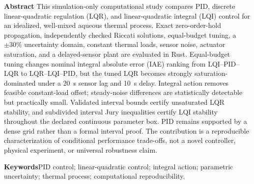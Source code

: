 \small\noindent\textbf{Abstract}\quad
This simulation-only computational study compares PID, discrete linear-quadratic regulation (LQR), and linear-quadratic integral (LQI) control for an idealized, well-mixed aqueous thermal process. Exact zero-order-hold propagation, independently checked Riccati solutions, equal-budget tuning, a $\pm30\%$ uncertainty domain, constant thermal loads, sensor noise, actuator saturation, and a delayed-sensor plant are evaluated in Rust. Equal-budget tuning changes nominal integral absolute error (IAE) ranking from LQI--PID--LQR to LQR--LQI--PID, but the tuned LQR becomes strongly saturation-dominated under a \SI{20}{s} sensor lag and \SI{10}{s} delay. Integral action removes feasible constant-load offset; steady-noise differences are statistically detectable but practically small. Validated interval bounds certify unsaturated LQR stability, and subdivided interval Jury inequalities certify LQI stability throughout the declared continuous parameter box. PID remains supported by a dense grid rather than a formal interval proof. The contribution is a reproducible characterization of conditional performance trade-offs, not a novel controller, physical experiment, or universal robustness claim.

\par\vspace{0.7em}\noindent\textbf{Keywords}\quad PID control; linear-quadratic control; integral action; parametric uncertainty; thermal process; computational reproducibility.

